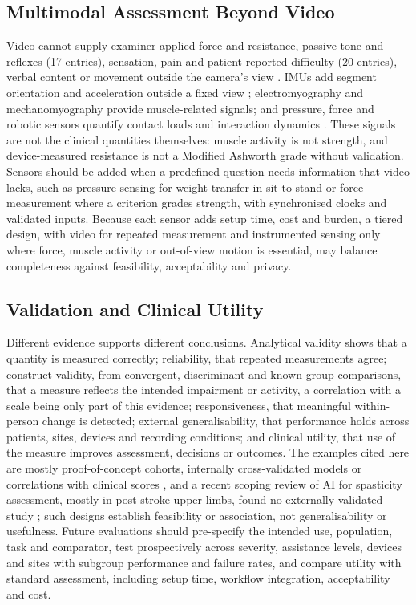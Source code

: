 \documentclass[11pt]{article}
\begin{document}
\subsection{Multimodal Assessment Beyond Video}

Video cannot supply examiner-applied force and resistance, passive tone and reflexes (17 entries), sensation, pain and patient-reported difficulty (20 entries), verbal content or movement outside the camera's view \cite{S3John202437682075,S3Stenum202438530801}. IMUs add segment orientation and acceleration outside a fixed view \cite{Yang2013SpatiotemporalGait,Held2018UpperLimbIMU}; electromyography and mechanomyography provide muscle-related signals; and pressure, force and robotic sensors quantify contact loads and interaction dynamics \cite{Li2017IMUEMGMotorEvaluation,Formstone2021IMUMMG,Grimm2021KinematicValidation}. These signals are not the clinical quantities themselves: muscle activity is not strength, and device-measured resistance is not a Modified Ashworth grade without validation. Sensors should be added when a predefined question needs information that video lacks, such as pressure sensing for weight transfer in sit-to-stand or force measurement where a criterion grades strength, with synchronised clocks and validated inputs. Because each sensor adds setup time, cost and burden, a tiered design, with video for repeated measurement and instrumented sensing only where force, muscle activity or out-of-view motion is essential, may balance completeness against feasibility, acceptability and privacy.

\subsection{Validation and Clinical Utility}
\label{sec:validation}

Different evidence supports different conclusions. Analytical validity shows that a quantity is measured correctly; reliability, that repeated measurements agree; construct validity, from convergent, discriminant and known-group comparisons, that a measure reflects the intended impairment or activity, a correlation with a scale being only part of this evidence; responsiveness, that meaningful within-person change is detected; external generalisability, that performance holds across patients, sites, devices and recording conditions; and clinical utility, that use of the measure improves assessment, decisions or outcomes. The examples cited here are mostly proof-of-concept cohorts, internally cross-validated models or correlations with clinical scores \cite{S3Lonini202235224426,Lee2021SmartphoneVideoAmbulation,Proffitt2023DepthMovement,Grimm2021KinematicValidation}, and a recent scoping review of AI for spasticity assessment, mostly in post-stroke upper limbs, found no externally validated study \cite{Cao2026AISpasticity}; such designs establish feasibility or association, not generalisability or usefulness. Future evaluations should pre-specify the intended use, population, task and comparator, test prospectively across severity, assistance levels, devices and sites with subgroup performance and failure rates, and compare utility with standard assessment, including setup time, workflow integration, acceptability and cost.
\end{document}
